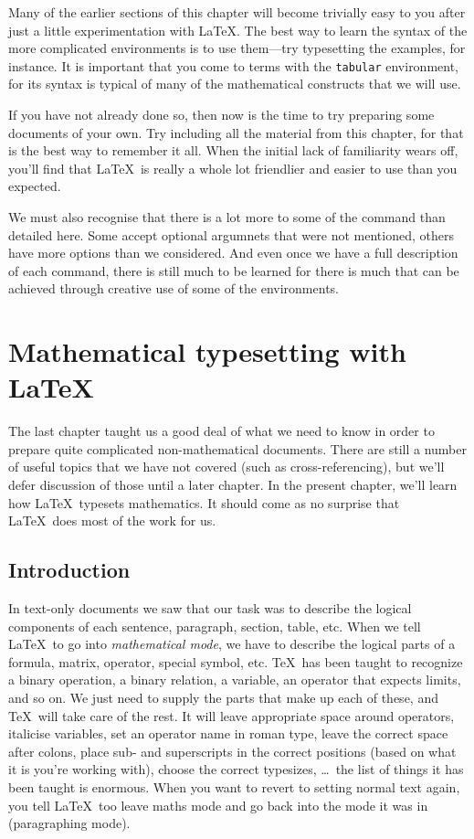 Many of the earlier sections of this chapter will become
trivially easy to you after just a little experimentation
with \LaTeX.  The best way to learn the syntax of the more
complicated environments is to use them---try typesetting
the examples, for instance.  It is important that you come
to terms with the {\tt tabular} environment, for its
syntax is typical of many of the mathematical constructs 
that we will use.

If you have not already done so, then now is the time
to try preparing some documents of your own.  Try
including all the material from this chapter, for
that is the best way to remember it all.  When
the initial lack of familiarity wears off, you'll
find that \LaTeX\ is really a whole lot friendlier
and easier to use than you expected.

We must also recognise that there is a lot more to some of the command
than detailed here.  Some accept optional argumnets that were not mentioned,
others have more options than we considered.  And even once we have a full
description of each command, there is still much to be learned for there
is much that can be achieved through creative use of some of the environments.





\chapter{Mathematical typesetting with \LaTeX}


The last chapter taught us a good deal of what we need to know in order to
prepare quite complicated non-mathematical documents.  There are still a
number of useful topics that we have not covered (such as cross-referencing),
but we'll defer discussion of those until a later chapter.  In the present
chapter, we'll learn how \LaTeX\ typesets mathematics.  It should come
as no surprise that \LaTeX\ does most of the work for us.

\section{Introduction}
In text-only documents we saw that our task was to describe the logical
components of each sentence, paragraph, section, table, etc.
When we tell \LaTeX\ to go into {\em mathematical mode}, we have to
describe the logical parts of a formula, matrix, operator, special symbol, etc.
\TeX\ has been taught to recognize a binary operation, a binary relation,
a variable, an operator that expects limits, and so on.  We just need to 
supply the parts that make up each of these, and \TeX\ will take care of
the rest.  It will leave appropriate space around operators, italicise variables,
set an operator name in roman type, leave the correct space after colons, 
place sub- and superscripts in the correct positions (based on what it is
you're working with), choose the correct typesizes, \ldots\ the list of things it has been taught is
enormous.  When you want to revert to setting normal text again, you tell
\LaTeX\ too leave maths mode and go back into the mode it was in (paragraphing
mode).

